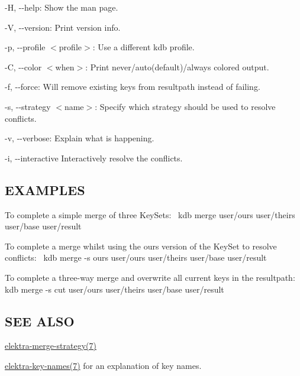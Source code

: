 \begin{DoxyItemize}
\item {\ttfamily -\/H}, {\ttfamily -\/-\/help}\+: Show the man page.
\item {\ttfamily -\/V}, {\ttfamily -\/-\/version}\+: Print version info.
\item {\ttfamily -\/p}, {\ttfamily -\/-\/profile $<$profile$>$}\+: Use a different kdb profile.
\item {\ttfamily -\/C}, {\ttfamily -\/-\/color $<$when$>$}\+: Print never/auto(default)/always colored output.
\item {\ttfamily -\/f}, {\ttfamily -\/-\/force}\+: Will remove existing keys from {\ttfamily resultpath} instead of failing.
\item {\ttfamily -\/s}, {\ttfamily -\/-\/strategy $<$name$>$}\+: Specify which strategy should be used to resolve conflicts.
\item {\ttfamily -\/v}, {\ttfamily -\/-\/verbose}\+: Explain what is happening.
\item {\ttfamily -\/i}, {\ttfamily -\/-\/interactive} Interactively resolve the conflicts.
\end{DoxyItemize}

\subsection*{E\+X\+A\+M\+P\+L\+ES}

To complete a simple merge of three Key\+Sets\+:~\newline
 {\ttfamily kdb merge user/ours user/theirs user/base user/result}~\newline


To complete a merge whilst using the {\ttfamily ours} version of the Key\+Set to resolve conflicts\+:~\newline
 {\ttfamily kdb merge -\/s ours user/ours user/theirs user/base user/result}~\newline


To complete a three-\/way merge and overwrite all current keys in the {\ttfamily resultpath}\+:~\newline
 {\ttfamily kdb merge -\/s cut user/ours user/theirs user/base user/result}~\newline


\subsection*{S\+EE A\+L\+SO}


\begin{DoxyItemize}
\item \hyperlink{md_doc_help_elektra-merge-strategy_doc_help_elektra-merge-strategy_md}{elektra-\/merge-\/strategy(7)}
\item \hyperlink{md_doc_help_elektra-key-names_doc_help_elektra-key-names_md}{elektra-\/key-\/names(7)} for an explanation of key names. 
\end{DoxyItemize}